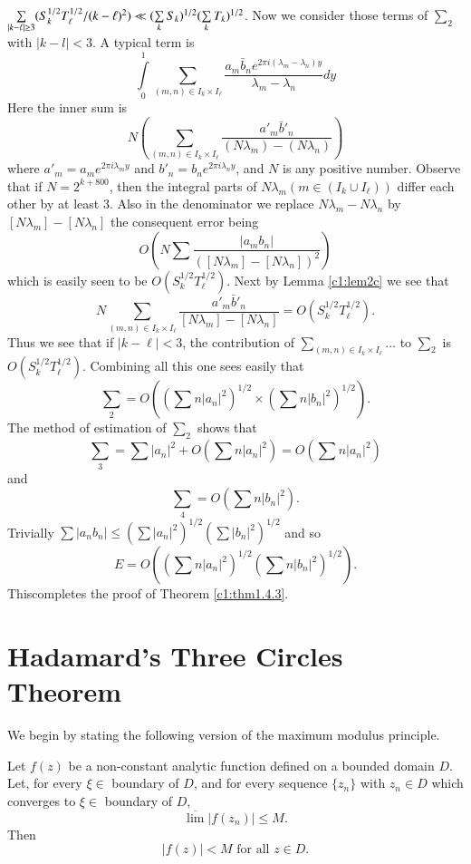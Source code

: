 $\sum\limits_{|k-\ell| \geq 3} (S^{1/2}_k T^{1/2}_{\ell} / (k-\ell)^2)
\ll (\sum\limits_k S_k)^{1/2}\break (\sum\limits_k T_k)^{1/2}$. Now we
consider those terms of $\sum_2$ with $|k-l| <3$. A typical term is  
$$
\int\limits^1_0 \sum\limits_{(m,n) \in I_k \times I_{\ell}} \frac{a_m \bar{b}_n e^{2\pi i(\lambda_m -\lambda_n)y}}{\lambda_m - \lambda_n} dy 
$$
Here the inner sum is 
$$
N \left( \sum\limits_{(m,n) \in I_k \times I_{\ell}} \frac{a'_m \bar{b}'_n}{(N\lambda_m) - (N \lambda_n)} \right)
$$
where $a'_m = a_m e^{2\pi i \lambda_m y}$ and $b'_n = b_ne^{2\pi i \lambda_n y}$, and $N$ is any positive number. Observe that if $N = 2^{k+800}$, then the integral parts of $N \lambda_m(m \in (I_k \cup I_{\ell}))$ differ each other by at least 3. Also in the denominator we replace $N \lambda_{m} -N \lambda_n$ by $[N\lambda_m] - [N\lambda_n]$ the consequent error being
$$
O\left( N \sum \frac{|a_m b_n|}{([N \lambda_m] - [N\lambda_n])^2}\right)
$$
which is easily seen to be $O(S^{1/2}_k T^{1/2}_\ell)$. Next by Lemma \ref{c1:lem2c} we see that
$$
N \sum\limits_{(m,n) \in I_k \times I_{\ell}} \frac{a'_m \bar{b}'_n}{[N\lambda_m] - [N\lambda_n]} = O(S^{1/2}_k T^{1/2}_\ell).
$$
Thus we see that if $|k-\ell| < 3$, the contribution of
$\sum\limits_{(m,n) \in I_k \times  I_{\ell}} \ldots $ to $\sum_2$ is
$O(S^{1/2}_k T^{1/2}_\ell)$. Combining all this one sees easily that
$$\sum_2 = O((\sum n |a_n|^2)^{1/2} \times (\sum n
|b_n|^2)^{1/2}).$$ 
The method of estimation of $\sum_2$ shows that
$$\sum_3 = \sum |a_n|^2 + O(\sum n |a_n|^2) = O(\sum n |a_n|^2)$$ 
and
$$\sum_4 = O(\sum n |b_n|^2).$$ 
Trivially $\sum | a_n b_n | \leq (\sum
|a_n|^2)^{1/2} (\sum|b_n|^2)^{1/2}$ and so 
$$
E = O \left( \left(\sum n|a_n|^2 \right)^{1/2} \left(\sum n |b_n|^2 \right)^{1/2} \right) .
$$
This\pageoriginale completes the proof of Theorem \ref{c1:thm1.4.3}.

\section{Hadamard's Three Circles Theorem}\label{c1:sec1.5}
We begin by stating the following version of the maximum modulus principle.

\begin{theorem}\label{c1:thm1.5.1}
Let $f(z)$ be a non-constant analytic function defined on a bounded domain $D$. Let, for every $\xi \in $ boundary of $D$, and for every sequence $\{z_n\}$ with $z_n \in D$ which converges to $\xi \in$ boundary of $D$,
$$
\overline{\lim} |f(z_n)| \leq M.
$$
Then
$$
|f(z)| < M \text{ for all } z \in D.
$$
\end{theorem}

